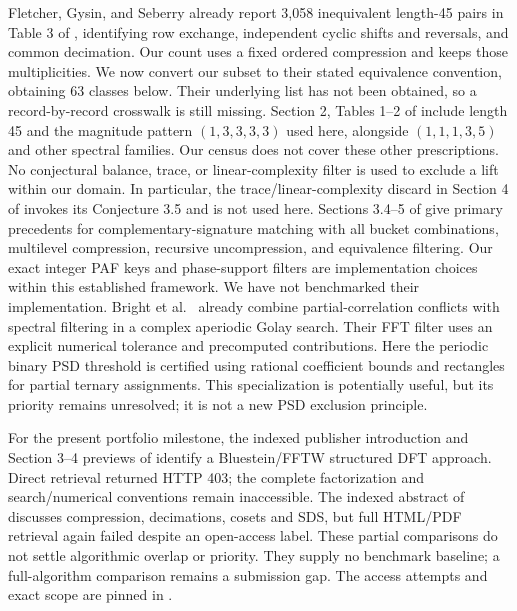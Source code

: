 \documentclass[11pt]{article}
\begin{document}
Fletcher, Gysin, and Seberry already report 3,058 inequivalent length-45
pairs in Table 3 of \cite{fletcher}, identifying row exchange, independent
cyclic shifts and reversals, and common decimation. Our count uses a fixed
ordered compression and keeps those multiplicities. We now convert our subset
to their stated equivalence convention, obtaining 63 classes below. Their
underlying list has not been obtained, so a record-by-record crosswalk is
still missing. Section 2, Tables 1--2 of
\cite{mod5} include length 45 and the magnitude pattern $(1,3,3,3,3)$
used here, alongside $(1,1,1,3,5)$ and other spectral families. Our census
does not cover these other prescriptions. No conjectural balance, trace,
or linear-complexity filter is used to exclude a lift within our domain.
In particular, the trace/linear-complexity discard in Section 4 of
\cite{issac} invokes its Conjecture 3.5 and is not used here.
Sections 3.4--5 of \cite{lumsden} give primary precedents for
complementary-signature matching with all bucket combinations, multilevel
compression, recursive uncompression, and equivalence filtering. Our exact
integer PAF keys and phase-support filters are implementation choices within
this established framework. We have not benchmarked their implementation.
Bright et al.\ \cite[Sections 3.3 and 3.5]{brightgolay} already combine
partial-correlation conflicts with spectral filtering in a complex aperiodic
Golay search. Their FFT filter uses an explicit numerical tolerance and
precomputed contributions. Here the periodic binary PSD threshold is
certified using rational coefficient bounds and rectangles for partial
ternary assignments. This specialization is potentially useful, but its
priority remains unresolved; it is not a new PSD exclusion principle.

For the present portfolio milestone, the indexed publisher introduction and
Section 3--4 previews of \cite{perera} identify a Bluestein/FFTW structured
DFT approach. Direct retrieval returned HTTP 403; the complete factorization
and search/numerical conventions remain inaccessible. The indexed abstract
of \cite{pq2} discusses compression, decimations, cosets and SDS, but full
HTML/PDF retrieval again failed despite an open-access label. These partial
comparisons do not settle algorithmic overlap or priority. They supply no
benchmark baseline; a full-algorithm comparison remains a submission gap.
The access attempts and exact scope are pinned in
.
\end{document}
